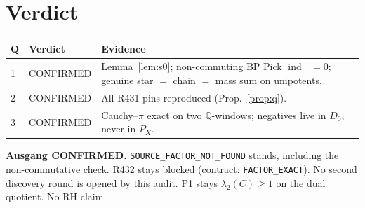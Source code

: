\documentclass[11pt]{article}
\theoremstyle{remark}
\newcommand{\indm}{\operatorname{ind}_{-}}
\begin{document}
\section{Verdict}

\begin{table}[h]
\centering
\small
\begin{tabular}{@{}llp{7.6cm}@{}}
\toprule
Q & Verdict & Evidence \\
\midrule
1 & CONFIRMED
  & Lemma~\ref{lem:s0}; non-commuting BP Pick $\indm=0$;
    genuine star $=$ chain $=$ mass sum on unipotents. \\
2 & CONFIRMED
  & All R431 pins reproduced (Prop.~\ref{prop:q}). \\
3 & CONFIRMED
  & Cauchy--$\pi$ exact on two $\mathbb{Q}$-windows;
    negatives live in $D_0$, never in $P_X$. \\
\bottomrule
\end{tabular}
\end{table}

\noindent
\textbf{Ausgang CONFIRMED.}
\texttt{SOURCE\_FACTOR\_NOT\_FOUND} stands, including the
non-commutative check.
R432 stays blocked (contract: \texttt{FACTOR\_EXACT}).
No second discovery round is opened by this audit.
P1 stays $\lambda_2(C)\ge 1$ on the dual quotient.
No RH claim.
\end{document}
